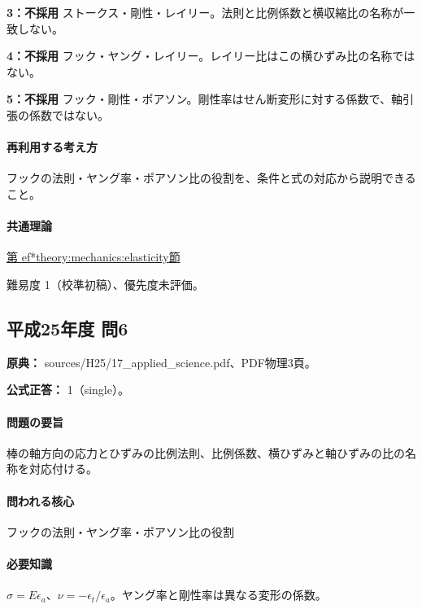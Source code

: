 \noindent\textbf{3：不採用} ストークス・剛性・レイリー。法則と比例係数と横収縮比の名称が一致しない。\par

\noindent\textbf{4：不採用} フック・ヤング・レイリー。レイリー比はこの横ひずみ比の名称ではない。\par

\noindent\textbf{5：不採用} フック・剛性・ポアソン。剛性率はせん断変形に対する係数で、軸引張の係数ではない。\par

\paragraph{再利用する考え方} フックの法則・ヤング率・ポアソン比の役割を、条件と式の対応から説明できること。

\paragraph{共通理論} \hyperref[theory:mechanics:elasticity]{第
ef*{theory:mechanics:elasticity}節}

\par 難易度 1（校準初稿）、優先度未評価。

\subsection{平成25年度 問6}
\label{q:h25-reg-applied-06}

\noindent\textbf{原典：} sources/H25/17\_applied\_science.pdf、PDF物理3頁。

\textbf{公式正答：} 1（single）。

\paragraph{問題の要旨} 棒の軸方向の応力とひずみの比例法則、比例係数、横ひずみと軸ひずみの比の名称を対応付ける。

\paragraph{問われる核心} フックの法則・ヤング率・ポアソン比の役割

\paragraph{必要知識} \(\sigma=E\epsilon_a\)、\(\nu=-\epsilon_t/\epsilon_a\)。ヤング率と剛性率は異なる変形の係数。

